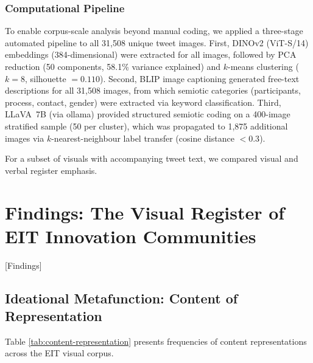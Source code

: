 \documentclass[../main.tex]{subfiles}
\begin{document}
\subsubsection{Computational Pipeline}

To enable corpus-scale analysis beyond manual coding, we applied a
three-stage automated pipeline to all 31,508 unique tweet
images.
First, DINOv2 (ViT-S/14) embeddings (384-dimensional) were extracted
for all images, followed by PCA reduction (50 components, 58.1\%
variance explained) and $k$-means clustering ($k = 8$, silhouette
$= 0.110$). Second, BLIP image captioning
generated free-text descriptions for all 31,508 images, from which
semiotic categories (participants, process, contact, gender) were
extracted via keyword classification. Third, LLaVA~7B (via ollama)
provided structured semiotic coding on a 400-image stratified sample
(50 per cluster), which was propagated to 1,875 additional images via
$k$-nearest-neighbour label transfer (cosine distance $< 0.3$).

For a subset of visuals with accompanying tweet text, we compared
visual and verbal register emphasis.

\section{Findings: The Visual Register of EIT Innovation Communities}[Findings]

\subsection{Ideational Metafunction: Content of Representation}

Table \ref{tab:content-representation} presents frequencies of content representations across the EIT visual corpus.
\end{document}
